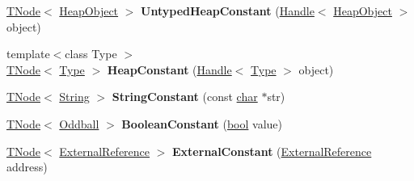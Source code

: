 \begin{DoxyCompactItemize}
\mbox{\label{classv8_1_1internal_1_1compiler_1_1CodeAssembler_ad820bed3af7fe0d446ffca069345be37}} 
\mbox{\hyperlink{classv8_1_1internal_1_1compiler_1_1TNode}{T\+Node}}$<$ \mbox{\hyperlink{classv8_1_1internal_1_1HeapObject}{Heap\+Object}} $>$ {\bfseries Untyped\+Heap\+Constant} (\mbox{\hyperlink{classv8_1_1internal_1_1Handle}{Handle}}$<$ \mbox{\hyperlink{classv8_1_1internal_1_1HeapObject}{Heap\+Object}} $>$ object)
\item 
\mbox{\label{classv8_1_1internal_1_1compiler_1_1CodeAssembler_aa9a18ec76fad714594f42e36780c4567}} 
{\footnotesize template$<$class Type $>$ }\\\mbox{\hyperlink{classv8_1_1internal_1_1compiler_1_1TNode}{T\+Node}}$<$ \mbox{\hyperlink{classv8_1_1internal_1_1compiler_1_1Type}{Type}} $>$ {\bfseries Heap\+Constant} (\mbox{\hyperlink{classv8_1_1internal_1_1Handle}{Handle}}$<$ \mbox{\hyperlink{classv8_1_1internal_1_1compiler_1_1Type}{Type}} $>$ object)
\item 
\mbox{\label{classv8_1_1internal_1_1compiler_1_1CodeAssembler_a6e5e48a340743b09b18b27940dc84929}} 
\mbox{\hyperlink{classv8_1_1internal_1_1compiler_1_1TNode}{T\+Node}}$<$ \mbox{\hyperlink{classv8_1_1internal_1_1String}{String}} $>$ {\bfseries String\+Constant} (const \mbox{\hyperlink{classchar}{char}} $\ast$str)
\item 
\mbox{\label{classv8_1_1internal_1_1compiler_1_1CodeAssembler_a9cd9de2f8ea37d98e58d32b0ccbfa3e1}} 
\mbox{\hyperlink{classv8_1_1internal_1_1compiler_1_1TNode}{T\+Node}}$<$ \mbox{\hyperlink{classv8_1_1internal_1_1Oddball}{Oddball}} $>$ {\bfseries Boolean\+Constant} (\mbox{\hyperlink{classbool}{bool}} value)
\item 
\mbox{\label{classv8_1_1internal_1_1compiler_1_1CodeAssembler_abcdff5a83d05bdd19d62feaeefdd5709}} 
\mbox{\hyperlink{classv8_1_1internal_1_1compiler_1_1TNode}{T\+Node}}$<$ \mbox{\hyperlink{classv8_1_1internal_1_1ExternalReference}{External\+Reference}} $>$ {\bfseries External\+Constant} (\mbox{\hyperlink{classv8_1_1internal_1_1ExternalReference}{External\+Reference}} address)
\item 

\end{DoxyCompactItemize}
